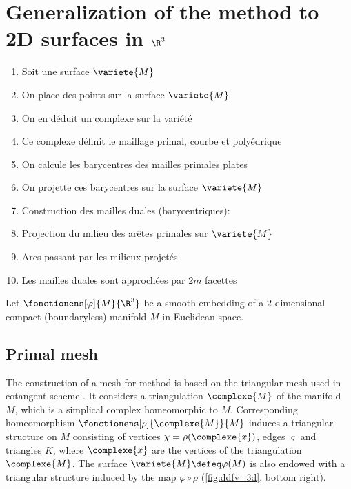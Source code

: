 \section{Generalization of the \ddfv method to 2D surfaces in $\R^3$ {\cite{tomek_discrete_2016, tomek_discrete_2019} \cite[Sec. 2.1]{andreianov_discrete_2007}}}

\begin{envide}
\begin{enumerate}
    \item Soit une surface $\variete{M}$
    \item On place des points sur la surface $\variete{M}$
    \item On en déduit un complexe sur la variété
    \item Ce complexe définit le maillage primal, courbe et polyédrique
    \item On calcule les barycentres des mailles primales plates
    \item On projette ces barycentres sur la surface $\variete{M}$
    \item Construction des mailles duales (barycentriques):
    \item Projection du milieu des arêtes primales sur $\variete{M}$
    \item Arcs passant par les milieux projetés
    \item Les mailles duales sont approchées par $2m$ facettes
\end{enumerate}    
\end{envide}

\noindent Let $\fonctionens[\varphi]{M}{\R^3}$ be a smooth embedding of a $2$-dimensional compact (boundaryless) manifold $M$ in Euclidean space. 

\subsection{Primal mesh}

The construction of a mesh for \ddfv method is based on the triangular mesh used in cotangent scheme \cite{meyer_discrete_2003}. It considers a triangulation $\complexe{M}$ of the manifold $M$, which is a simplical complex homeomorphic to $M$. Corresponding homeomorphism $\fonctionens[\rho]{\complexe{M}}{M}$ induces a triangular structure on $M$ consisting of vertices $\chi = \rho(\complexe{x})$, edges $\varsigma$ and triangles $K$, where $\complexe{x}$ are the vertices of the triangulation $\complexe{M}$. The surface $\variete{M} \defeq \varphi(M)$ is also endowed with a triangular structure induced by the map $\varphi \circ \rho$ (\ref{fig:ddfv_3d}, bottom right).

